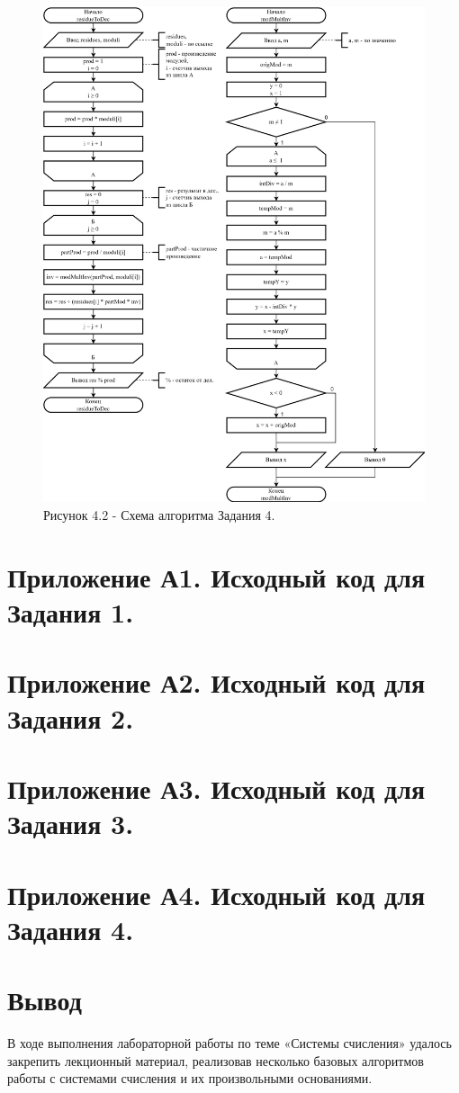 \documentclass[oneside,a4paper,14pt]{extarticle} %
\begin{document}
\begin{figure}[!ht]
	\centering
	\includegraphics[height=0.84\textheight]{pics/4-flowchart-p2.png}
	\caption*{Рисунок 4.2 - Схема алгоритма Задания 4.}
\end{figure}
\newpage

\section*{Приложение А1. Исходный код для Задания 1.}
\newpage
\section*{Приложение А2. Исходный код для Задания 2.}
\newpage
\section*{Приложение А3. Исходный код для Задания 3.}
\newpage
\section*{Приложение А4. Исходный код для Задания 4.}
\section*{Вывод}
В ходе выполнения лабораторной работы по теме «Системы счисления» удалось
закрепить лекционный материал, реализовав несколько базовых алгоритмов работы с
системами счисления и их произвольными основаниями.
\end{document}
